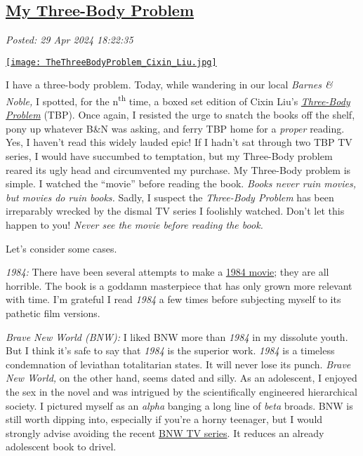 %

\subsection*{\href{http://analyzethedatanotthedrivel.org/2024/04/29/my-three-body-problem/}{My Three-Body Problem}}


\noindent\emph{Posted: 29 Apr 2024 18:22:35}
\vspace{6pt}

\captionsetup[floatingfigure]{labelformat=empty}
\begin{floatingfigure}[l]{0.23\textwidth}
\centering
\href{https://www.barnesandnoble.com/w/the-three-body-problem-cixin-liu/1119317099}{\texttt{[image: TheThreeBodyProblem\_Cixin\_Liu.jpg]}}
\label{fig:8124x0} \end{floatingfigure} I have a three-body problem. Today, while wandering in our local
\emph{Barnes \& Noble,} I spotted, for the n\textsuperscript{th} time, a
boxed set edition of Cixin Liu's \href{https://www.barnesandnoble.com/w/the-three-body-problem-cixin-liu/1119317099}{\emph{Three-Body Problem}} (TBP). Once
again, I resisted the urge to snatch the books off the shelf, pony up
whatever B\&N was asking, and ferry TBP home for a \emph{proper}
reading. Yes, I haven't read this widely lauded epic! If I hadn't sat
through two TBP TV series, I would have succumbed to temptation, but my
Three-Body problem reared its ugly head and circumvented my purchase. My
Three-Body problem is simple. I watched the ``movie'' before reading the
book. \emph{Books never ruin movies, but movies do ruin books.} Sadly, I
suspect the \emph{Three-Body Problem} has been irreparably wrecked by
the dismal TV series I foolishly watched. Don't let this happen to you!
\emph{Never see the movie before reading the book.}

Let's consider some cases.

\emph{1984:} There have been several attempts to make a
\href{https://en.wikipedia.org/wiki/Adaptations_of_Nineteen_Eighty-Four}{1984
movie}; they are all horrible. The book is a goddamn masterpiece that
has only grown more relevant with time. I'm grateful I read \emph{1984}
a few times before subjecting myself to its pathetic film versions.

\emph{Brave New World (BNW):} I liked BNW more than \emph{1984} in my
dissolute youth. But I think it's safe to say that \emph{1984} is the
superior work. \emph{1984} is a timeless condemnation of leviathan
totalitarian states. It will never lose its punch. \emph{Brave New
World,} on the other hand, seems dated and silly. As an adolescent, I enjoyed the 
sex in the novel and was intrigued by the
scientifically engineered hierarchical society. I pictured myself as an
\emph{alpha} banging a long line of \emph{beta} broads. BNW is still
worth dipping into, especially if you're a horny teenager, but I would
strongly advise avoiding the recent \href{https://www.imdb.com/title/tt9814116/}{BNW TV series}. It reduces
an already adolescent book to drivel.

